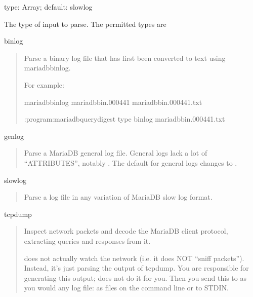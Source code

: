 \documentclass[letterpaper,10pt,english]{sphinxmanual}
\begin{document}
\begin{fulllineitems}
\label{\detokenize{mariadb-query-digest:cmdoption-mariadb-query-digest-type}}
\sphinxAtStartPar
type: Array; default: slowlog

\sphinxAtStartPar
The type of input to parse.  The permitted types are

\sphinxAtStartPar
binlog
\begin{quote}

\sphinxAtStartPar
Parse a binary log file that has first been converted to text using mariadb\sphinxhyphen{}binlog.

\sphinxAtStartPar
For example:

\begin{sphinxVerbatim}[commandchars=\\\{\}]
mariadb\PYGZhy{}binlog mariadb\PYGZhy{}bin.000441 \PYGZgt{} mariadb\PYGZhy{}bin.000441.txt

:program:mariadb\PYGZhy{}query\PYGZhy{}digest \PYGZhy{}\PYGZhy{}type binlog mariadb\PYGZhy{}bin.000441.txt
\end{sphinxVerbatim}
\end{quote}

\sphinxAtStartPar
genlog
\begin{quote}

\sphinxAtStartPar
Parse a MariaDB general log file.  General logs lack a lot of “ATTRIBUTES”,
notably .  The default {\hyperref[\detokenize{mariadb-query-digest:cmdoption-mariadb-query-digest-order-by}]{}} for general logs
changes to .
\end{quote}

\sphinxAtStartPar
slowlog
\begin{quote}

\sphinxAtStartPar
Parse a log file in any variation of MariaDB slow log format.
\end{quote}

\sphinxAtStartPar
tcpdump
\begin{quote}

\sphinxAtStartPar
Inspect network packets and decode the MariaDB client protocol, extracting queries
and responses from it.

\sphinxAtStartPar
{} does not actually watch the network (i.e. it does NOT “sniff
packets”).  Instead, it’s just parsing the output of tcpdump.  You are
responsible for generating this output;  does not do it for you.
Then you send this to  as you would any log file: as files on the
command line or to STDIN.


\end{quote}
\end{fulllineitems}
\end{document}
